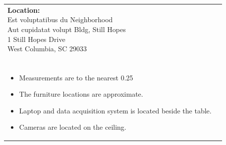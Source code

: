\documentclass[12pt]{article}
\begin{document}
    \vspace*{\fill}  %
    \begin{table}[H]
	\begin{tabular}{l l}
		\makecell[lt]{
			\textbf{Location:}\\
     		Est voluptatibus du Neighborhood \\
 		    Aut cupidatat volupt Bldg, Still Hopes\\
           	1 Still Hopes Drive\\
           	West Columbia, SC 29033\\\\
        }   	
        &	
		\makecell[tp{5in}]{
		\textbf{Notes:}\\
		\vspace{-8mm}  %
		\begin{itemize}
			\setlength\itemsep{-3mm}  %
			\item Measurements are to the nearest \SI{0.25}{\inch}
			\item The furniture locations are approximate.
			\item Laptop and data acquisition system is located beside the table.
			\item Cameras are located on the ceiling.
		\end{itemize}
		}	
			
	\end{tabular}
	\vspace{-8mm} %
\end{table}

    
\end{document}
